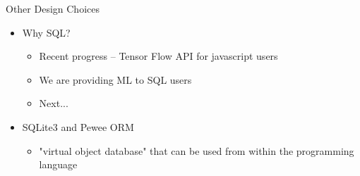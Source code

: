 \documentclass[handout, xcolor={dvipsnames}]{beamer}
\begin{document}
\begin{frame}{Other Design Choices}{}
  \begin{itemize}
   \item Why SQL?
    \begin{itemize}
        \item<1-> Recent progress -- Tensor Flow API for javascript users
        \item<2-> We are providing ML to SQL users
        \item<3-> Next... 
    \end{itemize}
    \vspace{.2in}
   \item SQLite3 and Pewee ORM
   \begin{itemize}
       \item "virtual object database" that can be used from within the programming language
   \end{itemize}
  \end{itemize}
\end{frame}
\end{document}

